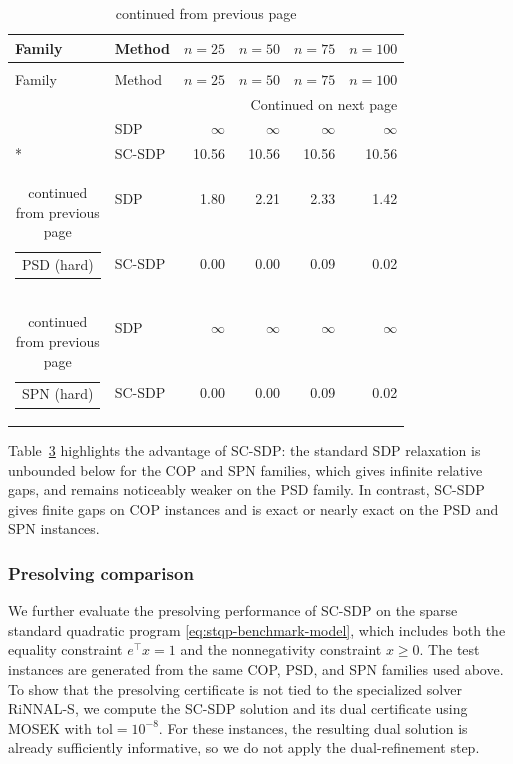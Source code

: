 \documentclass[11pt]{article}
\def\tol{\mathrm{tol}}
\theoremstyle{plain}
\begin{document}
\small
\begin{longtable}{llrrrr}
\caption{Relative gaps (\%) for relaxations of \eqref{eq:stqp-benchmark-model}.}
\label{tab:stqp-relgap-values}\\
\toprule
Family & Method & $n=25$ & $n=50$ & $n=75$ & $n=100$ \\
\midrule
\endfirsthead
\caption[]{continued from previous page}\\
\toprule
Family & Method & $n=25$ & $n=50$ & $n=75$ & $n=100$ \\
\midrule
\endhead
\midrule
\multicolumn{6}{r}{Continued on next page}\\
\endfoot
\bottomrule
\endlastfoot
\multirow{2}{*}{\begin{tabular}[c]{@{}c@{}}COP (easy)\end{tabular}} & SDP & $\infty$ & $\infty$ & $\infty$ & $\infty$ \\*
 & SC-SDP & 10.56 & 10.56 & 10.56 & 10.56 \\
\midrule
\multirow{2}{*}{\begin{tabular}[c]{@{}c@{}}PSD (hard)\end{tabular}} & SDP & 1.80 & 2.21 & 2.33 & 1.42 \\*
 & SC-SDP & 0.00 & 0.00 & 0.09 & 0.02 \\
\midrule
\multirow{2}{*}{\begin{tabular}[c]{@{}c@{}}SPN (hard)\end{tabular}} & SDP & $\infty$ & $\infty$ & $\infty$ & $\infty$ \\*
 & SC-SDP & 0.00 & 0.00 & 0.09 & 0.02 \\
\end{longtable}
\normalsize

Table~\ref{tab:stqp-relgap-values} highlights the advantage of SC-SDP: the standard SDP relaxation is unbounded below for the COP and SPN families, which gives infinite relative gaps, and remains noticeably weaker on the PSD family. In contrast, SC-SDP gives finite gaps on COP instances and is exact or nearly exact on the PSD and SPN instances.

\subsubsection{Presolving comparison}\label{subsubsec:stqp-presolving-comparison}

We further evaluate the presolving performance of SC-SDP on the sparse standard quadratic program \eqref{eq:stqp-benchmark-model}, which includes both the equality constraint $e^\top x=1$ and the nonnegativity constraint $x\ge0$. The test instances are generated from the same COP, PSD, and SPN families used above. 
{To show that the presolving certificate is not tied to the specialized solver RiNNAL-S, we compute the SC-SDP solution and its dual certificate using MOSEK with $\tol=10^{-8}$.} For these instances, the resulting dual solution is already sufficiently informative, so we do not apply the dual-refinement step.
\end{document}
